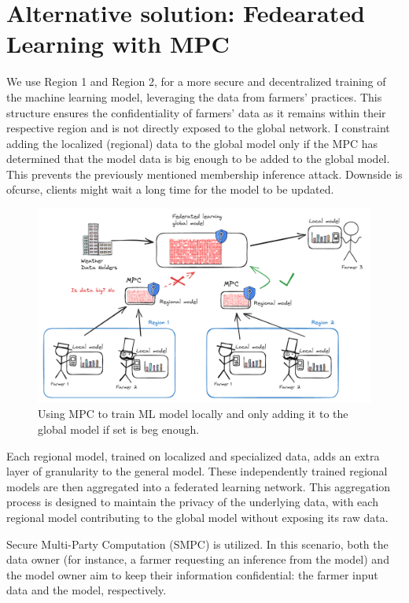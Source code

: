 \newpage
\section{Alternative solution: Fedearated Learning with MPC}

We use Region 1 and Region 2, for a more secure and decentralized training of the machine learning model, leveraging the data from farmers'
practices. This structure ensures the confidentiality of farmers' data as it remains within their respective region and is not directly
exposed to the global network. I constraint adding the localized (regional) data to the global model only if the MPC has determined that
the model data is big enough to be added to the global model. This prevents the previously mentioned membership inference attack.
Downside is ofcurse, clients might wait a long time for the model to be updated.

\begin{figure}[!htbp]
  \centering
  \includegraphics[width=\textwidth]{assets/img_9}
  \caption{Using MPC to train ML model locally and only adding it to the global model if set is beg enough.}
  \label{fig:img_9}
\end{figure}

Each regional model, trained on localized and specialized data, adds an extra layer of granularity to the
general model. These independently trained regional models are then aggregated into a federated learning network. This aggregation
process is designed to maintain the privacy of the underlying data, with each regional model contributing to the global model without exposing its raw data.

Secure Multi-Party Computation (SMPC) is utilized. In this scenario, both the data owner (for instance, a farmer requesting an inference
from the model) and the model owner aim to keep their information confidential: the farmer input data and the model, respectively.

